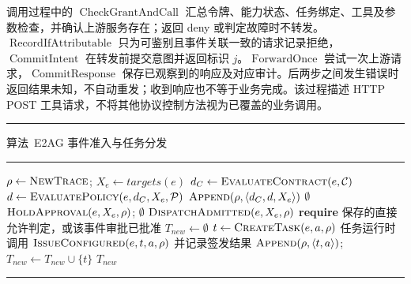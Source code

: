 调用过程中的 $\operatorname{CheckGrantAndCall}$ 汇总令牌、能力状态、任务绑定、工具及参数检查，并确认上游服务存在；返回 deny 或判定故障时不转发。$\operatorname{RecordIfAttributable}$ 只为可鉴别且事件关联一致的请求记录拒绝，$\operatorname{CommitIntent}$ 在转发前提交意图并返回标识 $j$。$\operatorname{ForwardOnce}$ 尝试一次上游请求，$\operatorname{CommitResponse}$ 保存已观察到的响应及对应审计。后两步之间发生错误时返回结果未知，不自动重发；收到响应也不等于业务完成。该过程描述 HTTP POST 工具请求，不将其他协议控制方法视为已覆盖的业务调用。

\par\addvspace{\intextsep}
\noindent\begin{minipage}{\linewidth}
\noindent\rule{\linewidth}{0.6pt}
\label{alg:e2ag-v11}
{\centering 算法~\thealgorithm\quad E2AG 事件准入与任务分发\par}
\vspace{-0.5\baselineskip}
\noindent\rule{\linewidth}{0.4pt}
\begin{algorithmic}[1]
  \State $\rho\gets\Call{NewTrace}{}$; $X_e\gets targets(e)$
  \State $d_C\gets\Call{EvaluateContract}{e,\mathcal C}$
  \State $d\gets\Call{EvaluatePolicy}{e,d_C,X_e,\mathcal P}$
  \State $\Call{Append}{\rho,\langle d_C,d,X_e\rangle}$
   \State \Return $\emptyset$ \EndIf
    \State $\Call{HoldApproval}{e,X_e,\rho}$; \Return $\emptyset$
  \EndIf
  \State \Return $\Call{DispatchAdmitted}{e,X_e,\rho}$
\EndProcedure
{}
  \State \textbf{require} 保存的直接允许判定，或该事件审批已批准
  \State $T_{new}\gets\emptyset$
    \State $t\gets\Call{CreateTask}{e,a,\rho}$
    \State 任务运行时调用 $\Call{IssueConfigured}{e,t,a,\rho}$ 并记录签发结果
    \State $\Call{Append}{\rho,\langle t,a\rangle}$; $T_{new}\gets T_{new}\cup\{t\}$
  \EndFor
  \State \Return $T_{new}$
\EndProcedure
\end{algorithmic}
\noindent\rule{\linewidth}{0.6pt}
\end{minipage}
\par\addvspace{\intextsep}

